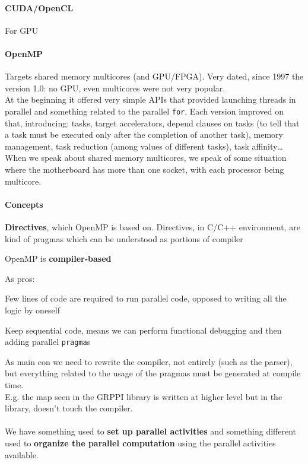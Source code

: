 \documentclass[10pt]{report}
\begin{document}
\paragraph{CUDA/OpenCL} For GPU
\paragraph{OpenMP} Targets shared memory multicores (and GPU/FPGA). Very dated, since 1997 the version 1.0: no GPU, even multicores were not very popular.\\
At the beginning it offered very simple APIs that provided launching threads in parallel and something related to the parallel \texttt{for}. Each version improved on that, introducing: tasks, target accelerators, depend clauses on tasks (to tell that a task must be executed only after the completion of another task), memory management, task reduction (among values of different tasks), task affinity\ldots\\
When we speak about shared memory multicores, we speak of some situation where the motherboard has more than one socket, with each processor being multicore.
\paragraph{Concepts}\begin{list}{}{}
	\item \textbf{Directives}, which OpenMP is based on. Directives, in C/C++ environment, are kind of pragmas which can be understood as portions of compiler
	\item OpenMP is \textbf{compiler-based}
\end{list}
As pros:
\begin{list}{}{}
	\item Few lines of code are required to run parallel code, opposed to writing all the logic by oneself
	\item Keep sequential code, means we can perform functional debugging and then adding parallel \texttt{pragma}s
\end{list}
As main con we need to rewrite the compiler, not entirely (such as the parser), but everything related to the usage of the pragmas must be generated at compile time.\\
E.g. the map seen in the GRPPI library is written at higher level but in the library, doesn't touch the compiler.\\\\
We have something used to \textbf{set up parallel activities} and something different used to \textbf{organize the parallel computation} using the parallel activities available.
\end{document}
